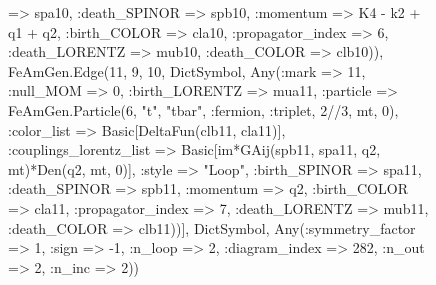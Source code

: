 \documentclass{revtex4}
\begin{document}
\begin{figure}[!htb]
\begin{center}
{=> spa10, :death_SPINOR => spb10, :momentum => K4 - k2 + q1 + q2, :birth_COLOR => cla10, :propagator_index => 6, :death_LORENTZ => mub10, :death_COLOR => clb10)), FeAmGen.Edge(11, 9, 10, Dict{Symbol, Any}(:mark => 11, :null_MOM => 0, :birth_LORENTZ => mua11, :particle => FeAmGen.Particle(6, "t", "tbar", :fermion, :triplet, 2//3, mt, 0), :color_list => Basic[DeltaFun(clb11, cla11)], :couplings_lorentz_list => Basic[im*GAij(spb11, spa11, q2, mt)*Den(q2, mt, 0)], :style => "Loop", :birth_SPINOR => spa11, :death_SPINOR => spb11, :momentum => q2, :birth_COLOR => cla11, :propagator_index => 7, :death_LORENTZ => mub11, :death_COLOR => clb11))], Dict{Symbol, Any}(:symmetry_factor => 1, :sign => -1, :n_loop => 2, :diagram_index => 282, :n_out => 2, :n_inc => 2)) 
}
\end{center}
\end{figure}
\end{document}
